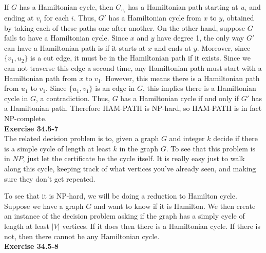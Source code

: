 \documentclass{article}
\begin{document}
If $G$ has a Hamiltonian cycle, then $G_{e_i}$ has a Hamiltonian path starting at $u_i$ and ending at $v_i$ for each $i$.  Thus, $G'$ has a Hamiltonian cycle from $x$ to $y$, obtained by taking each of these paths one after another.  On the other hand, suppose $G$ fails to have a Hamiltonian cycle.  Since $x$ and $y$ have degree 1, the only way $G'$ can have a Hamiltonian path is if it starts at $x$ and ends at $y$.  Moreover, since $\{v_1, u_2\}$ is a cut edge, it must be in the Hamiltonian path if it exists.  Since we can not traverse this edge a second time, any Hamiltonian path must start with a Hamiltonian path from $x$ to $v_1$.  However, this means there is a Hamiltonian path from $u_1$ to $v_1$.  Since $\{u_1,v_1\}$ is an edge in $G$, this implies there is a Hamiltonian cycle in $G$, a contradiction.  Thus, $G$ has a Hamiltonian cycle if and only if $G'$ has a Hamiltonian path.  Therefore HAM-PATH is NP-hard, so HAM-PATH is in fact NP-complete. \\

\noindent\textbf{Exercise 34.5-7}\\

The related decision problem is to, given a graph $G$ and integer $k$ decide if there is a simple cycle of length at least $k$ in the graph $G$. To see that this problem is in $NP$, just let the certificate be the cycle itself. It is really easy just to walk along this cycle, keeping track of what vertices you've already seen, and making sure they don't get repeated.

To see that it is NP-hard, we will be doing a reduction to Hamilton cycle. Suppose we have a graph $G$ and want to know if it is Hamilton. We then create an instance of the decision problem asking if the graph has a simply cycle of length at least $|V|$ vertices. If it does then there is a Hamiltonian cycle. If there is not, then there cannot be any Hamiltonian cycle.\\

\noindent\textbf{Exercise 34.5-8}\\
\end{document}

